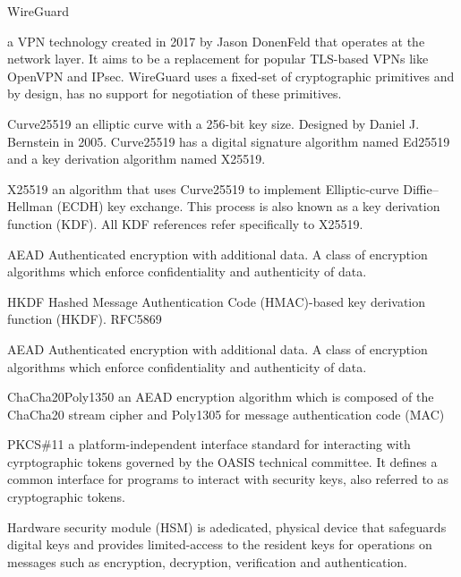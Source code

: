 \documentclass [11pt, proquest] {uwthesis}[2020/02/24]
\begin{document}
\begin{glossary}

\item[WireGuard]

a VPN technology created in 2017 by Jason DonenFeld that operates at the network layer. It aims to be a replacement for popular TLS-based VPNs like OpenVPN and IPsec. WireGuard uses a fixed-set of cryptographic primitives and by design, has no support for negotiation of these primitives. 

\item[Curve25519]
an elliptic curve with a 256-bit key size. Designed by Daniel J. Bernstein in 2005\cite{bernstein_curve25519_2005}. 
Curve25519 has a digital signature algorithm named Ed25519 and a key derivation algorithm named X25519.

\item[X25519]
an algorithm that uses Curve25519 to implement Elliptic-curve Diffie–Hellman (ECDH) key exchange. This process is also known as a key derivation function (KDF). All KDF references refer specifically to X25519.

\item[AEAD]
Authenticated encryption with additional data. A class of encryption algorithms which enforce confidentiality and authenticity of data. 

\item{HKDF}
Hashed Message Authentication Code (HMAC)-based key derivation function (HKDF). RFC5869 \cite{krawczyk_hmac-based_2010}

\item[AEAD]
Authenticated encryption with additional data. A class of encryption algorithms which enforce confidentiality and authenticity of data. 

\item[ChaCha20Poly1350]
an AEAD encryption algorithm which is composed of the ChaCha20 stream cipher and Poly1305 for message authentication code (MAC)

\item[PKCS\#11] a platform-independent interface standard for interacting with cyrptographic tokens governed by the OASIS technical committee\cite{noauthor_cryptsoft_2020}.
It defines a common interface for programs to interact with security keys, also referred to as cryptographic tokens.

\item[Hardware security module]
(HSM) is adedicated, physical device that safeguards digital keys and provides limited-access to the resident keys for operations on messages such as encryption, decryption, verification and authentication. 


\end{glossary}
\end{document}
